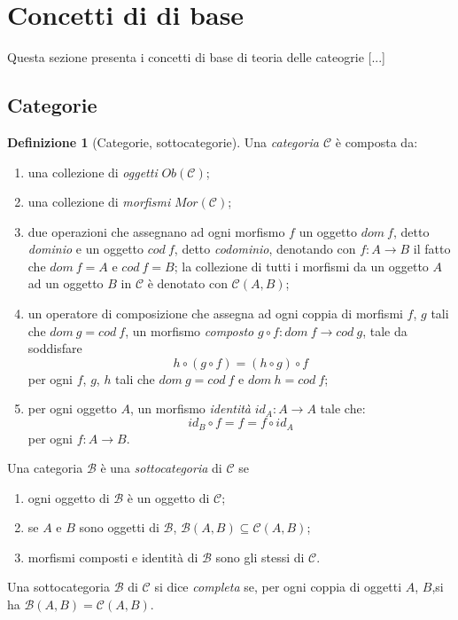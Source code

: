 \documentclass{article}
\theoremstyle{plain}
\theoremstyle{definition}
\newtheorem{definition}[theorem]{Definizione}
\newcommand{\id}[1]{id_{#1}}
\begin{document}
\section{Concetti di di base}

Questa sezione presenta i concetti di base di teoria delle cateogrie [...] 

\subsection{Categorie}

	\begin{definition}[Categorie, sottocategorie]
		Una \emph{categoria $\mathcal{C}$} è composta da:
		\begin{enumerate}
			\item una collezione di \emph{oggetti} $Ob(\mathcal{C})$;
			\item una collezione di \emph{morfismi} $Mor(\mathcal{C})$;
			\item due operazioni che assegnano ad ogni morfismo $f$ un 
				oggetto $dom\ f$, detto \emph{dominio} e un oggetto $cod\ f$, detto \emph{codominio}, 
				denotando con $f: A \rightarrow B$ il fatto che $dom\ f = A \text{ e } cod\ f = B$; 
				la collezione di tutti i morfismi da un oggetto $A$ ad un oggetto $B$ in $\mathcal{C}$ è 
				denotato con $\mathcal{C}(A, B)$;
			\item un operatore di composizione che assegna ad ogni coppia di morfismi $f$, $g$ tali che 
				$dom\ g = cod\ f$, un morfismo \emph{composto} $g \circ f: dom\ f \rightarrow cod\ g$, 
				tale da soddisfare
				\[
					h \circ (g \circ f) = (h \circ g) \circ f
				\]
				per ogni $f$, $g$, $h$ tali che $dom\ g = cod\ f \text{ e } dom\ h = cod\ f$;
			\item per ogni oggetto $A$, un morfismo \emph{identità} $\id{A}: A \rightarrow A$ tale che:
				\[
					\id{B} \circ f = f = f \circ \id{A}
				\]
				per ogni $f: A \rightarrow B$.
		\end{enumerate}

		Una categoria $\mathcal{B}$ è una \emph{sottocategoria} di $\mathcal{C}$ se
		\begin{enumerate}
			\item ogni oggetto di $\mathcal{B}$ è un oggetto di $\mathcal{C}$;
			\item se $A$ e $B$ sono oggetti di $\mathcal{B}$, $\mathcal{B}(A, B) \subseteq \mathcal{C}(A, B)$;
			\item morfismi composti e identità di $\mathcal{B}$ sono gli stessi di $\mathcal{C}$.
		\end{enumerate}
		
		Una sottocategoria $\mathcal{B}$ di $\mathcal{C}$ si dice \emph{completa} se, per ogni coppia di oggetti $A$, $B$,si ha
		$\mathcal{B}(A, B) = \mathcal{C}(A, B)$.

	\end{definition}
\end{document}
